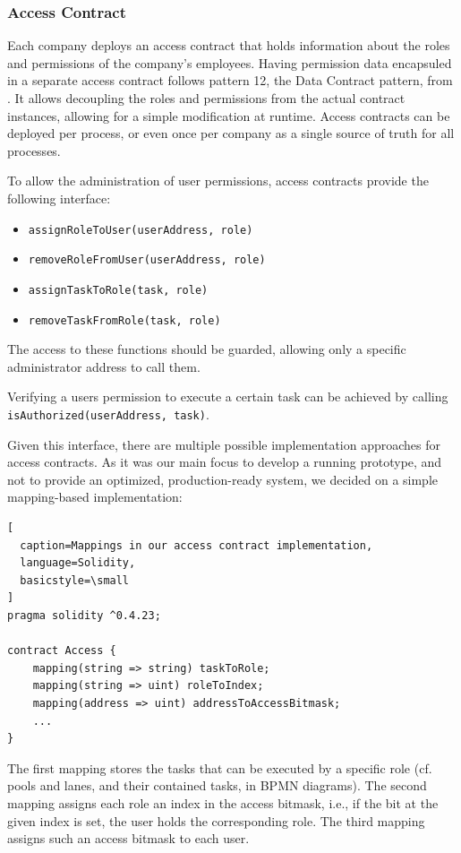 \documentclass[runningheads]{llncs}
\begin{document}
\subsubsection{Access Contract}

Each company deploys an access contract that holds information about the roles and permissions of the company's employees.
Having permission data encapsuled in a separate access contract follows pattern 12, the Data Contract pattern, from \cite{xu2018pattern}.
It allows decoupling the roles and permissions from the actual contract instances, allowing for a simple modification at runtime.
Access contracts can be deployed per process, or even once per company as a single source of truth for all processes.

To allow the administration of user permissions, access contracts provide the following interface:
\begin{itemize}
	\item
	      \texttt{assignRoleToUser(userAddress, role)}
	\item
	      \texttt{removeRoleFromUser(userAddress, role)}
	\item
	      \texttt{assignTaskToRole(task, role)}
	\item
	      \texttt{removeTaskFromRole(task, role)}
\end{itemize}
The access to these functions should be guarded, allowing only a specific administrator address to call them.

Verifying a users permission to execute a certain task can be achieved by calling \texttt{isAuthorized(userAddress, task)}.
\newline

Given this interface, there are multiple possible implementation approaches for access contracts.
As it was our main focus to develop a running prototype, and not to provide an optimized, production-ready system, we decided on a simple mapping-based implementation:
\begin{lstlisting}[
  caption=Mappings in our access contract implementation,
  language=Solidity,
  basicstyle=\small
]
pragma solidity ^0.4.23;

contract Access {
    mapping(string => string) taskToRole;
    mapping(string => uint) roleToIndex;
    mapping(address => uint) addressToAccessBitmask;
    ...
}
\end{lstlisting}
The first mapping stores the tasks that can be executed by a specific role (cf. pools and lanes, and their contained tasks, in BPMN diagrams).
The second mapping assigns each role an index in the access bitmask, i.e., if the bit at the given index is set, the user holds the corresponding role.
The third mapping assigns such an access bitmask to each user.
\end{document}
